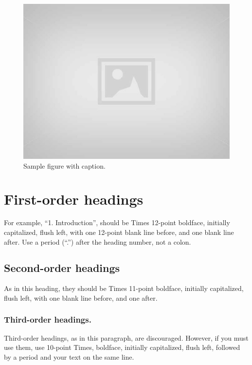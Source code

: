 \documentclass[10pt]{article}
\begin{document}
\begin{figure}[thb]
    \centering
	\includegraphics[trim={3cm 3cm 3cm 3cm}, clip,width=0.9\linewidth]{images/sample-image}
	\caption{Sample figure with caption.}
	\label{fig: sample-figure}       %
\end{figure}

\section{First-order headings}

For example, “1. Introduction”, should be Times 12-point boldface, initially capitalized, flush left, with one 12-point blank line before, and one blank line after. Use a period (“.”) after the heading number, not a colon. 

\subsection{Second-order headings}
 
As in this heading, they should be Times 11-point boldface, initially capitalized, flush left, with one blank line before, and one after. 

\subsubsection{Third-order headings. }

Third-order headings, as in this paragraph, are discouraged. However, if you must use them, use 10-point Times, boldface, initially capitalized, flush left, followed by a period and your text on the same line. 
\end{document}
